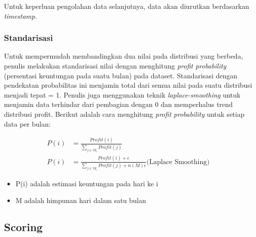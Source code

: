 \documentclass{article}
\begin{document}
\begin{adjustwidth}{4em}{0pt}
	
	\hspace{\parindent}Untuk keperluan pengolahan data selanjutnya, data akan diurutkan berdasarkan \textit{timestamp}.
	
\end{adjustwidth}

\subsubsection{Standarisasi}

\begin{adjustwidth}{4em}{0pt}
	
	\hspace{\parindent}Untuk mempermudah membandingkan dua nilai pada distribusi yang berbeda, penulis melakukan standarisasi nilai dengan menghitung \textit{profit probability} (persentasi keuntungan pada suatu bulan) pada dataset. Standarisasi dengan pendekatan probabilitas ini menjamin total dari semua nilai pada suatu distribusi menjadi tepat = 1. Penulis juga menggunakan teknik \textit{laplace-smoothing} untuk menjamin data terhindar dari pembagian dengan 0 dan memperhalus trend distribusi profit. Berikut adalah cara menghitung \textit{profit probability} untuk setiap data per bulan:
	
	\begin{align*}
	P(i) &= \frac{Profit(i)} {\sum\limits_{j \in M_i} Profit(j)}\\
	P(i) &= \frac{Profit(i)+\epsilon}{\sum\limits_{j \in M_i} Profit(j)+n(M)\epsilon} \text{(Laplace Smoothing)}
	\end{align*}
	
	\begin{itemize}
		\setlength{\itemindent}{1cm}
		\item{P(i) adalah estimasi keuntungan pada hari ke i}
		\item{M adalah himpunan hari dalam satu bulan}
	\end{itemize}
	
\end{adjustwidth}

\subsection{Scoring}
\end{document}
